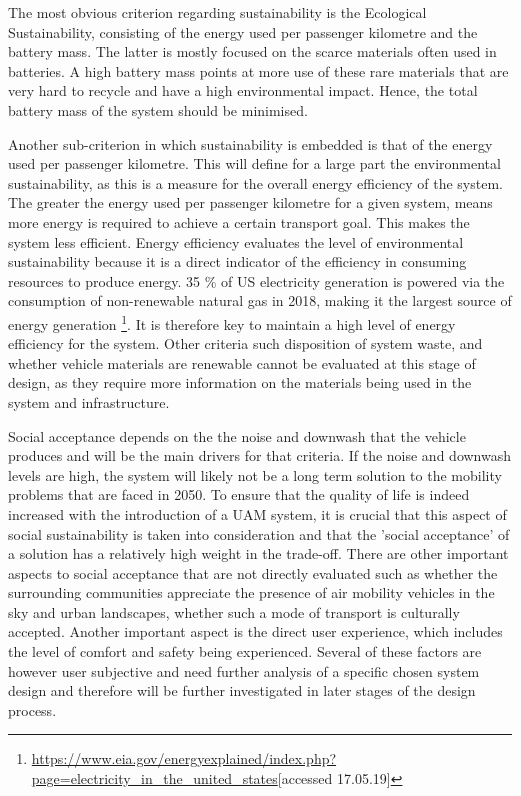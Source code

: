 The most obvious criterion regarding sustainability is the Ecological Sustainability, consisting of the energy used per passenger kilometre and the battery mass. The latter is mostly focused on the scarce materials often used in batteries. A high battery mass points at more use of these rare materials that are very hard to recycle and have a high environmental impact. Hence, the total battery mass of the system should be minimised.

Another sub-criterion in which sustainability is embedded is that of the energy used per passenger kilometre. This will define for a large part the environmental sustainability, as this is a measure for the overall energy efficiency of the system. The greater the energy used per passenger kilometre for a given system, means more energy is required to achieve a certain transport goal. This makes the system less efficient. Energy efficiency evaluates the level of environmental sustainability because it is a direct indicator of the efficiency in consuming resources to produce energy. 35 \% of US electricity generation is powered via the consumption of non-renewable natural gas in 2018, making it the largest source of energy generation \footnote{\url{https://www.eia.gov/energyexplained/index.php?page=electricity_in_the_united_states}[accessed 17.05.19]}. It is therefore key to maintain a high level of energy efficiency for the system. Other criteria such disposition of system waste, and whether vehicle materials are renewable cannot be evaluated at this stage of design, as they require more information on the materials being used in the system and infrastructure. 

Social acceptance depends on the the noise and downwash that the vehicle produces and will be the main drivers for that criteria. If the noise and downwash levels are high, the system will likely not be a long term solution to the mobility problems that are faced in 2050. To ensure that the quality of life is indeed increased with the introduction of a UAM system, it is crucial that this aspect of social sustainability is taken into consideration and that the 'social acceptance' of a solution has a relatively high weight in the trade-off. There are other important aspects to social acceptance that are not directly evaluated such as whether the surrounding communities appreciate the presence of air mobility vehicles in the sky and urban landscapes, whether such a mode of transport is culturally accepted. Another important aspect is the direct user experience, which includes the level of comfort and safety being experienced. Several of these factors are however user subjective and need further analysis of a specific chosen system design and therefore will be further investigated in later stages of the design process.

